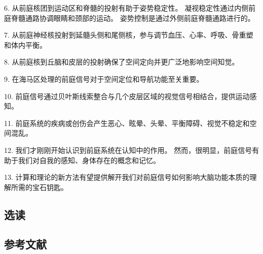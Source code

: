 6. 从前庭核团到运动区和脊髓的投射有助于姿势稳定性。 凝视稳定性通过内侧前庭脊髓通路协调眼睛和颈部的运动。 姿势控制是通过外侧前庭脊髓通路进行的。 

7. 从前庭神经核投射到延髓头侧和尾侧核，参与调节血压、心率、呼吸、骨重塑和体内平衡。 

8. 从前庭核到丘脑和皮层的投射确保了空间定向并更广泛地影响空间知觉。 

9. 在海马区处理的前庭信号对于空间定位和导航功能至关重要。 

10. 前庭信号通过贝叶斯线索整合与几个皮层区域的视觉信号相结合，提供运动感知。 

11. 前庭系统的疾病或创伤会产生恶心、眩晕、头晕、平衡障碍、视觉不稳定和空间混乱。 

12. 我们才刚刚开始认识到前庭系统在认知中的作用。 然而，很明显，前庭信号有助于我们对自我的感知、身体存在的概念和记忆。 

13. 计算和理论的新方法有望提供解开我们对前庭信号如何影响大脑功能本质的理解所需的宝石钥匙。
\subsection{选读}
\subsection{参考文献}

